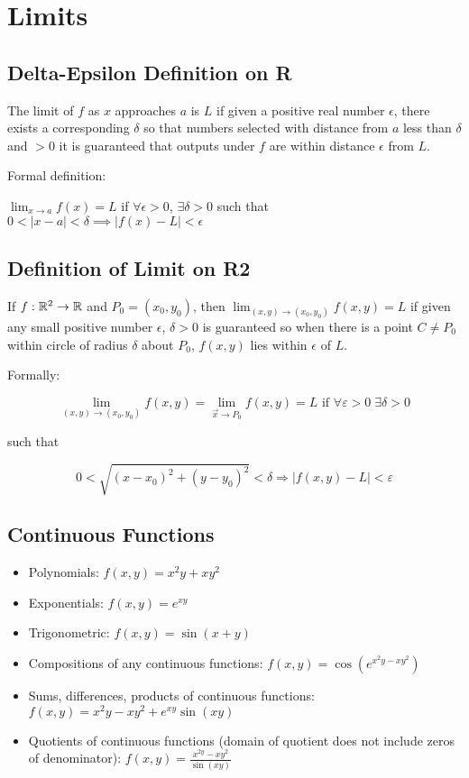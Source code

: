\section{Limits}

\subsection{Delta-Epsilon Definition on R}

The limit of $f$ as $x$ approaches $a$ is $L$ if given a positive real number
$\epsilon$, there exists a corresponding $\delta$ so that numbers selected with distance from $a$
less than $\delta$ and $>0$ it is guaranteed that outputs under $f$ are within distance $\epsilon$ from $L$.

Formal definition:

$\lim_{x\to a}f(x)=L$ if $\forall \epsilon >0$, $\exists\delta > 0$ such that $0< |x-a| < \delta \implies |f(x)-L|<\epsilon$

\subsection{Definition of Limit on R2}

If $f:\mathbb{R}^2\to \mathbb{R}$ and $P_0=(x_0,y_0)$, then $\lim _{(x, y) \rightarrow\left(x_{0}, y_{0}\right)} f(x, y)=L$ 
if given any small positive number $\epsilon$, $\delta>0$ is guaranteed so when there is a point $C\neq P_0$ within circle of radius $\delta$ about $P_0$, $f(x,y)$ lies within $\epsilon$ of $L$.

Formally: 

\[\lim _{(x, y) \rightarrow\left(x_{0}, y_{0}\right)} f(x, y)=\lim _{\vec{x} \rightarrow P_{0}} f(x, y)=L \text { if } \forall \varepsilon>0 \;\exists \delta>0\]

such that

\[0<\sqrt{\left(x-x_{0}\right)^{2}+\left(y-y_{0}\right)^{2}}<\delta \Longrightarrow|f(x, y)-L|<\varepsilon\]

\subsection{Continuous Functions}

\begin{itemize}
    \item Polynomials: $f(x,y)=x^2y+xy^2$
    \item Exponentials: $f(x,y)=e^{xy}$
    \item Trigonometric: $f(x,y)=\sin(x+y)$
    \item Compositions of any continuous functions: $f(x,y)=\cos(e^{x^2y-xy^2})$
    \item Sums, differences, products of continuous functions: $f(x, y)=x^{2} y-x y^{2}+e^{x y} \sin (x y)$
    \item Quotients of continuous functions (domain of quotient does not include zeros of denominator): $f(x, y)=\frac{x^{2 y}-x y^{2}}{\sin (x y)}$
\end{itemize}

